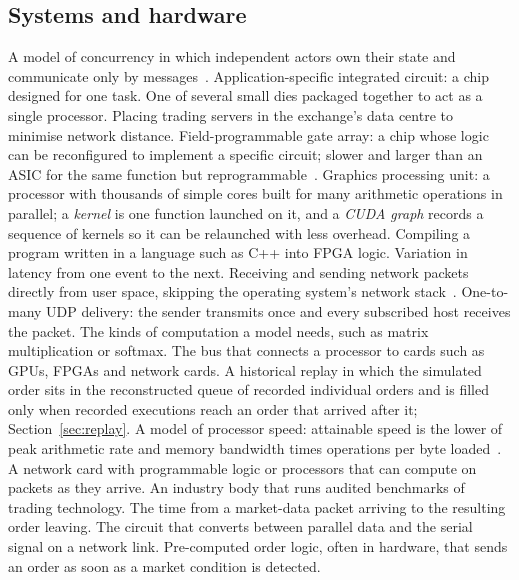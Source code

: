 \subsection{Systems and hardware}
\begin{description}[leftmargin=1.2em,style=sameline,itemsep=1pt,font=\normalfont\bfseries]
 A model of concurrency in which independent actors own their state and communicate
  only by messages~\citep{hewitt1973}.
 Application-specific integrated circuit: a chip designed for one task.
 One of several small dies packaged together to act as a single processor.
 Placing trading servers in the exchange's data centre to minimise network distance.
 Field-programmable gate array: a chip whose logic can be reconfigured to implement a
  specific circuit; slower and larger than an ASIC for the same function but
  reprogrammable~\citep{kuon2007}.
 Graphics processing unit: a processor with thousands of simple cores built for many arithmetic operations
  in parallel; a \emph{kernel} is one function launched on it, and a \emph{CUDA graph} records a sequence of kernels
  so it can be relaunched with less overhead.
 Compiling a program written in a language such as C++ into FPGA logic.
 Variation in latency from one event to the next.
 Receiving and sending network packets directly from user space, skipping the
  operating system's network stack~\citep{dpdk}.
 One-to-many UDP delivery: the sender transmits once and every subscribed host
  receives the packet.
 The kinds of computation a model needs, such as matrix multiplication or softmax.
 The bus that connects a processor to cards such as GPUs, FPGAs and network cards.
 A historical replay in which the simulated order sits in the reconstructed queue of recorded
  individual orders and is filled only when recorded executions reach an order that arrived after it; Section~\ref{sec:replay}.
 A model of processor speed: attainable speed is the lower of peak arithmetic rate and memory
  bandwidth times operations per byte loaded~\citep{williams2009roofline}.
 A network card with programmable logic or processors that can compute on packets as they arrive.
 An industry body that runs audited benchmarks of trading technology.
 The time from a market-data packet arriving to the resulting order leaving.
 The circuit that converts between parallel data and the serial signal on a network link.
 Pre-computed order logic, often in hardware, that sends an order as soon as a market
  condition is detected.
\end{description}

